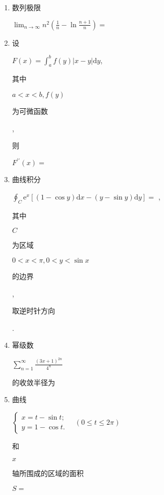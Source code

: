 \documentclass[10pt]{article}
\begin{document}
\begin{enumerate}
  \item \begin{CJK}{UTF8}{mj}数列极限\end{CJK} $\lim _{n \rightarrow \infty} n^{2}\left(\frac{1}{n}-\ln \frac{n+1}{n}\right)=$

  \item \begin{CJK}{UTF8}{mj}设\end{CJK} $F(x)=\int_{a}^{b} f(y)|x-y| \mathrm{d} y$, \begin{CJK}{UTF8}{mj}其中\end{CJK} $a<x<b, f(y)$ \begin{CJK}{UTF8}{mj}为可微函数\end{CJK}, \begin{CJK}{UTF8}{mj}则\end{CJK} $F^{\prime \prime}(x)=$

  \item \begin{CJK}{UTF8}{mj}曲线积分\end{CJK} $\oint_{C} \mathrm{e}^{x}[(1-\cos y) \mathrm{d} x-(y-\sin y) \mathrm{d} y]=$ , \begin{CJK}{UTF8}{mj}其中\end{CJK} $C$ \begin{CJK}{UTF8}{mj}为区域\end{CJK} $0<x<\pi, 0<y<\sin x$ \begin{CJK}{UTF8}{mj}的边界\end{CJK}, \begin{CJK}{UTF8}{mj}取逆时针方向\end{CJK}.

  \item \begin{CJK}{UTF8}{mj}幂级数\end{CJK} $\sum_{n=1}^{\infty} \frac{(3 x+1)^{2 n}}{4^{n}}$ \begin{CJK}{UTF8}{mj}的收敛半径为\end{CJK}

  \item \begin{CJK}{UTF8}{mj}曲线\end{CJK} $\left\{\begin{array}{l}x=t-\sin t ; \\ y=1-\cos t .\end{array} \quad(0 \leqslant t \leqslant 2 \pi)\right.$ \begin{CJK}{UTF8}{mj}和\end{CJK} $x$ \begin{CJK}{UTF8}{mj}轴所围成的区域的面积\end{CJK} $S=$


\end{enumerate}
\end{document}
